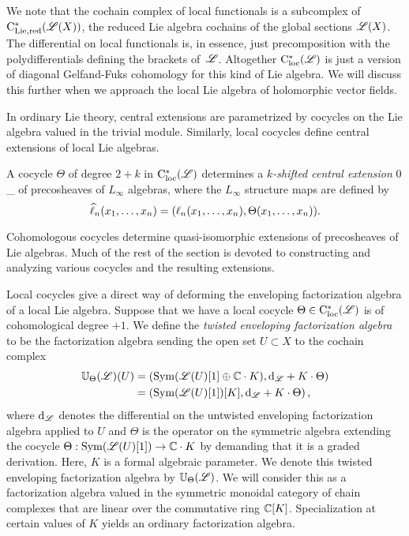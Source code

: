 \documentclass[10pt]{amsart}
\begin{document}
We note that the cochain complex of local functionals is a subcomplex of $\cred^*(\sL(X))$, the reduced Lie algebra cochains of the global sections $\sL(X)$.
The differential on local functionals is, in essence, just precomposition with the polydifferentials defining the brackets of~$\sL$.
Altogether $\cloc^*(\sL)$ is just a version of diagonal Gelfand-Fuks cohomology \cite{Fuks, LosikDiag} for this kind of Lie algebra. 
We will discuss this further when we approach the local Lie algebra of holomorphic vector fields.

In ordinary Lie theory, central extensions are parametrized by cocycles on the Lie algebra valued in the trivial module. 
Similarly, local cocycles define central extensions of local Lie algebras.

\begin{dfn}
A cocycle $\Theta$ of degree $2+k$ in $\cloc^*(\sL)$ determines a {\em $k$-shifted central extension}
\beqn\label{kext}
0 \to \CC[k] \to \Hat{\sL}_\theta \to \sL {}
\eeqn
of precosheaves of $L_\infty$ algebras, where the $L_\infty$ structure maps are defined by
\[
\Hat{\ell}_n(x_1,\ldots,x_n) = (\ell_n(x_1,\ldots,x_n), \Theta(x_1,\ldots,x_n)).
\]
\end{dfn}

Cohomologous cocycles determine quasi-isomorphic extensions of precosheaves of Lie algebras. 
Much of the rest of the section is devoted to constructing and analyzing various cocycles and the resulting extensions.

Local cocycles give a direct way of deforming the enveloping factorization algebra of a local Lie algebra.
Suppose that we have a local cocycle $\Theta \in \cloc^*(\sL)$ is of cohomological degree $+1$. 
We define the {\em twisted enveloping factorization algebra} to be the factorization algebra sending the open set $U \subset X$ to the cochain complex
\begin{align*}
\UU_\Theta(\sL)(U) & = \left(\Sym(\sL(U)[1] \oplus \CC \cdot K), \d_{\sL} + K \cdot \Theta\right) \\
& = \left(\Sym(\sL(U)[1])[K] , \d_{\sL} + K \cdot \Theta\right),
\end{align*}
where $\d_{\sL}$ denotes the differential on the untwisted enveloping factorization algebra applied to $U$ and $\Theta$ is the operator on the symmetric algebra extending the cocycle $\Theta : \Sym(\sL(U)[1]) \to \CC \cdot K$ by demanding that it is a graded derivation.
Here, $K$ is a formal algebraic parameter. 
We denote this twisted enveloping factorization algebra by $\UU_\Theta(\sL)$. 
We will consider this as a factorization algebra valued in the symmetric monoidal category of chain complexes that are linear over the commutative ring $\CC[K]$. 
Specialization at certain values of $K$ yields an ordinary factorization algebra. 
 
\end{document}
